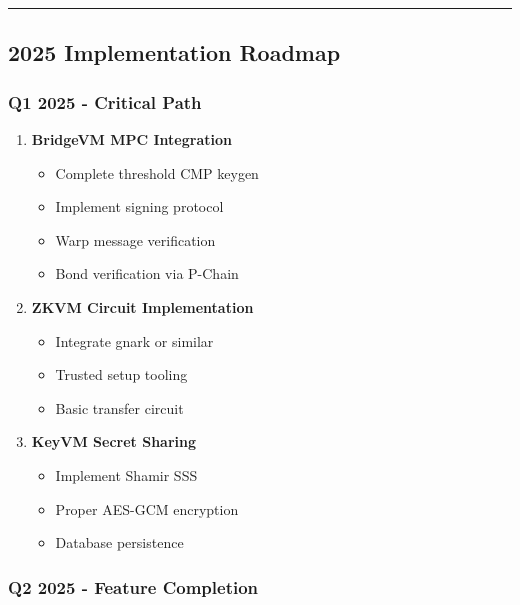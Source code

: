 \documentclass[
]{article}
\providecommand{\tightlist}{%
  \setlength{\itemsep}{0pt}\setlength{\parskip}{0pt}}
\begin{document}
\begin{center}\rule{0.5\linewidth}{0.5pt}\end{center}

\subsection{2025 Implementation
Roadmap}\label{2025-implementation-roadmap}

\subsubsection{Q1 2025 - Critical Path}\label{q1-2025---critical-path}

\begin{enumerate}
\def\labelenumi{\arabic{enumi}.}
\item
  \textbf{BridgeVM MPC Integration}

  \begin{itemize}
  \tightlist
  \item
    Complete threshold CMP keygen
  \item
    Implement signing protocol
  \item
    Warp message verification
  \item
    Bond verification via P-Chain
  \end{itemize}
\item
  \textbf{ZKVM Circuit Implementation}

  \begin{itemize}
  \tightlist
  \item
    Integrate gnark or similar
  \item
    Trusted setup tooling
  \item
    Basic transfer circuit
  \end{itemize}
\item
  \textbf{KeyVM Secret Sharing}

  \begin{itemize}
  \tightlist
  \item
    Implement Shamir SSS
  \item
    Proper AES-GCM encryption
  \item
    Database persistence
  \end{itemize}
\end{enumerate}

\subsubsection{Q2 2025 - Feature
Completion}\label{q2-2025---feature-completion}
\end{document}
